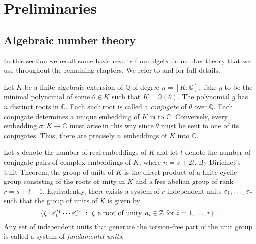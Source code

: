 
\chapter{Preliminaries}
\label{ch:Preliminaries}


\section{Algebraic number theory} 
\label{sec:AlgebraicNumberTheory}

In this section we recall some basic results from algebraic number theory that we use throughout the remaining chapters. We refer to \cite{Mar} and \cite{Neuk} for full details. 

Let $K$ be a finite algebraic extension of $\mathbb{Q}$ of degree $n = [K: \mathbb{Q}]$. Take $g$ to be the minimal polynomial of some $\theta \in K$ such that $K = \mathbb{Q}(\theta)$. The polynomial $g$ has $n$ distinct roots in $\mathbb{C}$. Each such root is called a \textit{conjugate} of $\theta$ over $\mathbb{Q}$. Each conjugate determines a unique embedding of $K$ in to $\mathbb{C}$. Conversely, every embedding $\sigma: K \to \mathbb{C}$ must arise in this way since $\theta$ must be sent to one of its conjugates. Thus, there are precisely $n$ embeddings of $K$ into $\mathbb{C}$. 

Let $s$ denote the number of real embeddings of $K$ and let $t$ denote the number of conjugate pairs of complex embeddings of $K$, where $n = s + 2t$. By Dirichlet's Unit Theorem, the group of units of $K$ is the direct product of a finite cyclic group consisting of the roots of unity in $K$ and a free abelian group of rank $r = s + t -1$. Equivalently, there exists a system of $r$ independent units $\varepsilon_1, \dots, \varepsilon_r$ such that the group of units of $K$ is given by 
\[\left\{\zeta \cdot \varepsilon_1^{a_1}\cdots \varepsilon_r^{a_r} \ : \ \zeta \text{ a root of unity}, a_i \in \mathbb{Z} \text{ for } i = 1, \dots, r\right\}.\]
Any set of independent units that generate the torsion-free part of the unit group is called a system of \textit{fundamental units}. 


